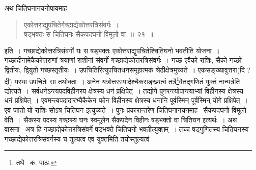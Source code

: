 \documentclass[11pt, openany]{book}
\begin{document}
अथ चितिघनानयनोपायमाह\textendash 

\begin{quote}
{\ab एकोत्तराद्युपचितेर्गच्छाद्येकोत्तरत्रिसंवर्गः~।\\
षड्भक्तः स चितिघनः सैकपदघनो विमूलो वा~॥~२१~॥}
\end{quote}

इति~। गच्छाद्येकोत्तरत्रिसंवर्गो यः स षड्भक्तः एकोत्तराद्युपचितेश्चितिघनो भवतीति योजना~। गच्छादीनामेकैकोत्तराणां त्रयाणां राशीनां संवर्गो गच्छाद्येकोत्तरत्रिसंवर्गः~। गच्छ एवैको राशिः, सैको गच्छो द्वितीयः, द्वियुतो गच्छस्तृतीयः~। उपचितिरित्युपचितधनसमूहात्मकं श्रेढीक्षेत्रमुच्यते~। एकसङ्ख्यावुत्तरा(दि ? दी) यस्या उपचितेः सा तथोक्ता~। अनेन यत्रोत्तरस्यादेश्चैकसङ्ख्यत्वं तत्रै\renewcommand{\thefootnote}{२}\footnote{तथै \textendash\ क. पाठः.}वैतद्गणितं युक्तं नान्यत्रेति द्योत्यते~। सर्वधनेऽन्त्यपदविहीनरय क्षेत्रस्य धनं प्रक्षिपेत्~। तद्योगे पुनरन्त्योपान्त्याभ्यां विहीनस्य क्षेत्रस्य धनं प्रक्षिपेत्~। एवमन्त्यपदादारभ्यैकैकेन पदेन विहीनस्य क्षेत्रस्य धनानि पूर्वस्मिन् पूर्वस्मिन् योगे प्रक्षिपेत्~। एवं जातो यो राशिः सोऽत्र चितिघन इत्युच्यते~। पुनः प्रकारान्तरेण चितिघनानयनमाह \textendash\ {\qt सैकपदघनो विमूलो वे}ति~। सैकस्य पदस्य गच्छस्य घनः स्वमूलेन सैकपदेन विहीनः षड्भक्तो वा चितिघन इत्यर्थः~। अथ वासना \textendash\ अत्र हि गच्छाद्येकोत्तरत्रिसंवर्गे षड्भक्ते चितिघनो भवतीत्युक्तम्~। तच्च षड्गुणितस्य चितिघनस्य गच्छाद्येकोत्तरत्रिसंवर्गस्य च तुल्यत्व एव युक्तमिति तयोस्तुल्यत्वं

\newpage
\end{document}
